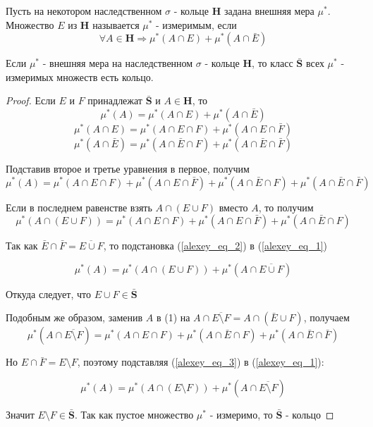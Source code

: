 Пусть на некотором наследственном $\sigma$ - кольце $\textbf{H}$ задана внешняя мера $\mu^{*}$. Множество $E$ из $\textbf{H}$ называется $\mu^{*}$ - измеримым, если 
$$
	\forall A \in \textbf{H} \Rightarrow \mu^{*}(A \cap E) + \mu^{*}(A \cap \bar{E})
$$

\begin{theorem_sub}
\cite{HalmoshTheoryM1953}
\label{ring}
Если  $\mu^{*}$ - внешняя мера на наследственном $\sigma$ - кольце $\textbf{H}$, то класс $\bar{\textbf{S}}$ всех $\mu^{*}$ - измеримых множеств есть кольцо. 
\end{theorem_sub}

\begin{proof}

Если $E$ и $F$ принадлежат $\bar{\textbf{S}}$ и $A \in \textbf{H}$, то
$$
	\mu^{*}(A) = \mu^{*}(A \cap E) + \mu^{*}(A \cap \bar{E})	
$$
$$
	\mu^{*}(A \cap E) = \mu^{*}(A \cap E \cap F) + \mu^{*}(A \cap E \cap \bar{F})
$$
$$
	\mu^{*}(A \cap \bar{E}) = \mu^{*}(A \cap \bar{E} \cap F) + \mu^{*}(A \cap \bar{E} \cap \bar{F})
$$

Подставив второе и третье уравнения в первое, получим
\begin{equation}\label{alexey_eq_1}
	\mu^{*}(A) = \mu^{*}(A \cap E \cap F) + \mu^{*}(A \cap E \cap \bar{F}) + \mu^{*}(A \cap \bar{E} \cap F) + \mu^{*}(A \cap \bar{E} \cap \bar{F})
\end{equation}

Если в последнем равенстве взять $A \cap (E \cup F)$ вместо $A$, то получим
\begin{equation}\label{alexey_eq_2}
	\mu^{*}(A \cap (E \cup F)) = \mu^{*}(A \cap E \cap F) + \mu^{*}(A \cap E \cap \bar{F}) + \mu^{*}(A \cap \bar{E} \cap F)
\end{equation}

Так как $\bar{E} \cap \bar{F} = \overline{E \cup F}$, то подстановка (\ref{alexey_eq_2}) в (\ref{alexey_eq_1})

$$
	\mu^{*}(A) = \mu^{*}(A \cap (E \cup F)) + \mu^{*}(A \cap \overline{E \cup F})
$$

Откуда следует, что $E \cup F \in \bar{\textbf{S}}$

Подобным же образом, заменив $A$ в (1) на $A \cap \overline{E \setminus F} = A \cap (\bar{E} \cup F)$, получаем
\begin{equation}\label{alexey_eq_3}
	\mu^{*}(A \cap \overline{E \setminus F}) = \mu^{*}(A \cap E \cap F) + \mu^{*}(A \cap \bar{E} \cap F) + \mu^{*}(A \cap \bar{E} \cap \bar{F})
\end{equation}

Но $E \cap \bar{F} = E \setminus F$, поэтому подставляя (\ref{alexey_eq_3}) в (\ref{alexey_eq_1}):

$$
	\mu^{*}(A) = \mu^{*}(A \cap (E \setminus F)) + \mu^{*}(A \cap \overline{E \setminus F})
$$

Значит $E \setminus F \in \bar{\textbf{S}}$. Так как пустое множество $\mu^{*}$ - измеримо, то $ \bar{\textbf{S}}$ -  кольцо
\end{proof}

